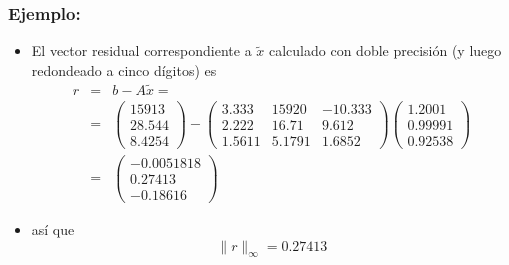 \documentclass{beamer}
\begin{document}
  \begin{frame}
    \frametitle{Ejemplo:}
    \begin{itemize}
      \item El vector residual correspondiente a $\tilde x$ calculado con doble precisi\'on (y luego redondeado a cinco d\'igitos) es 
      \small{
      \begin{eqnarray}
       \nonumber r & = & b - A \tilde x =\\
       \nonumber   & = & \left(\begin{array}{c}
            15913\\
            28.544\\
            8.4254
            \end{array}\right) - \left(\begin{array}{ccc}
             3.333 & 15920 & -10.333\\
             2.222 & 16.71 & 9.612\\
             1.5611 & 5.1791 & 1.6852
            \end{array}\right)\left(\begin{array}{c}
            1.2001\\
            0.99991\\
            0.92538
            \end{array}\right)\\
      \nonumber & = & \left(\begin{array}{c}
            -0.0051818\\
            0.27413\\
            -0.18616
            \end{array}\right)
      \end{eqnarray}}
      
      \item<2-> as\'i que 
       $$
       \|r\|_{\infty} = 0.27413
       $$
      \end{itemize}
    \end{frame}
\end{document}
